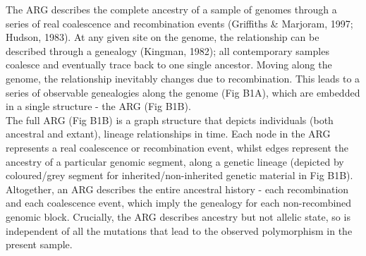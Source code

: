 \documentclass[twocolumn]{bmcart}%
\begin{document}
\begin{strip}
\begin{tcolorbox}[
  colback=blue!1!white,width=\columnwidth,colframe=blue!50!black,title= Box 1: Ancestral Recombination Graph (ARG),width=6.7in]
  
  \begin{multicols}{2}
\small{The ARG describes the complete ancestry of a sample of genomes through a series of real coalescence and recombination events (Griffiths \& Marjoram, 1997; Hudson, 1983). At any given site on the genome, the relationship can be described through a genealogy (Kingman, 1982); all contemporary samples coalesce and eventually trace back to one single ancestor. Moving along the genome, the relationship inevitably changes due to recombination. This leads to a series of observable genealogies along the genome (Fig B1A), which are embedded in a single structure - the ARG (Fig B1B). \\

The full ARG (Fig B1B) is a graph structure that depicts individuals (both ancestral and extant), lineage relationships in time. Each node in the ARG represents a real coalescence or recombination event, whilst edges represent the ancestry of a particular genomic segment, along a genetic lineage (depicted by coloured/grey segment for inherited/non-inherited genetic material in Fig B1B). Altogether, an ARG describes the entire ancestral history - each recombination and each coalescence event, which imply the genealogy for each non-recombined genomic block. Crucially, the ARG describes ancestry but not allelic state, so is independent of all the mutations that lead to the observed polymorphism in the present sample.\\

}
\end{multicols}
\end{tcolorbox}
\end{strip}
\end{document}
